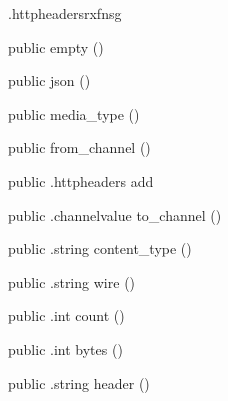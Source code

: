 \begin{CrexxClass}{.httpheaders}{rxfnsg}

  \begin{Hierarchy}
  \end{Hierarchy}

  \begin{Members}

    \Factory
      {public}
      {empty}
      {()}

    \Factory
      {public}
      {json}
      {()}

    \Factory
      {public}
      {media\_type}
      {()}

    \Factory
      {public}
      {from\_channel}
      {()}

    \Method
      {public}
      {.httpheaders}
      {add}
      {}

    \Method
      {public}
      {.channelvalue}
      {to\_channel}
      {()}

    \Method
      {public}
      {.string}
      {content\_type}
      {()}

    \Method
      {public}
      {.string}
      {wire}
      {()}

    \Method
      {public}
      {.int}
      {count}
      {()}

    \Method
      {public}
      {.int}
      {bytes}
      {()}

    \Method
      {public}
      {.string}
      {header}
      {()}

  \end{Members}
\end{CrexxClass}

